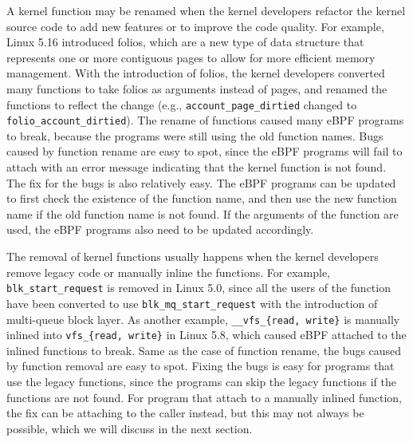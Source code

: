 A kernel function may be renamed when the kernel developers refactor the kernel source code to add new features or to improve the code quality.
For example, Linux 5.16 introduced folios, which are a new type of data structure that represents one or more contiguous pages to allow for more efficient memory management.
With the introduction of folios, the kernel developers converted many functions to take folios as arguments instead of pages, and renamed the functions to reflect the change (e.g., \texttt{account\_page\_dirtied} changed to \texttt{folio\_account\_dirtied}).
The rename of functions caused many eBPF programs to break, because the programs were still using the old function names.
Bugs caused by function rename are easy to spot, since the eBPF programs will fail to attach with an error message indicating that the kernel function is not found. 
The fix for the bugs is also relatively easy. The eBPF programs can be updated to first check the existence of the function name, and then use the new function name if the old function name is not found. 
If the arguments of the function are used, the eBPF programs also need to be updated accordingly.

The removal of kernel functions usually happens when the kernel developers remove legacy code or manually inline the functions.
For example, \texttt{blk\_start\_request} is removed in Linux 5.0, since all the users of the function have been converted to use \texttt{blk\_mq\_start\_request} with the introduction of multi-queue block layer.
As another example, \texttt{\_\_vfs\_\{read, write\}} is manually inlined into \texttt{vfs\_\{read, write\}} in Linux 5.8, which caused eBPF attached to the inlined functions to break.
Same as the case of function rename, the bugs caused by function removal are easy to spot. 
Fixing the bugs is easy for programs that use the legacy functions, since the programs can skip the legacy functions if the functions are not found.
For program that attach to a manually inlined function, the fix can be attaching to the caller instead, but this may not always be possible, which we will discuss in the next section.

